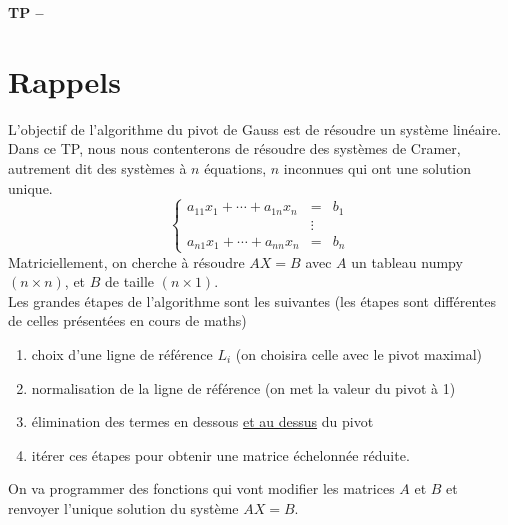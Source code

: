 






\begin{center}
{\Large\bf TP \no {\num} -- \descrip}
\end{center}


\section{Rappels}
\noindent L'objectif de l'algorithme du pivot de Gauss est de r\' esoudre un syst\` eme lin\' eaire. Dans ce TP, nous nous contenterons de r\' esoudre des syst\` emes de Cramer, autrement dit des syst\` emes \` a $n$ \' equations, $n$ inconnues qui ont une solution unique.\\
\[\left\lbrace \begin{array}{ccc}
a_{11}x_1+\cdots +a_{1n}x_n & =&b_1\\
&\vdots&\\
a_{n1}x_1+\cdots +a_{nn}x_n & =&b_n
\end{array}\right.\]
Matriciellement, on cherche \` a r\' esoudre $AX=B$ avec $A$ un tableau numpy $(n\times n)$, et $B$ de taille $(n\times 1)$.\\
Les grandes \' etapes de l'algorithme sont les suivantes (les \' etapes sont diff\' erentes de celles pr\' esent\' ees en cours de maths)
\begin{enumerate}
\item choix d'une ligne de r\' ef\' erence $L_i$ (on choisira celle avec le pivot maximal)
\item normalisation de la ligne de r\' ef\' erence (on met la valeur du pivot \` a 1)
\item \' elimination des termes en dessous \underline{et au dessus} du pivot
\item it\' erer ces \' etapes pour obtenir une matrice \' echelonn\' ee r\' eduite.
\end{enumerate}


\noindent On va programmer des fonctions qui vont modifier les matrices $A$ et $B$ et renvoyer l'unique solution du syst\` eme $AX=B$. 
 
